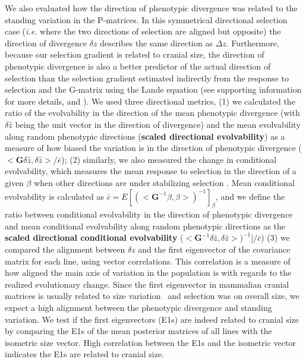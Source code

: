 \begin{refsection}
We also evaluated how the direction of phenotypic divergence was related
to the standing variation in the P-matrices. In this symmetrical
directional selection case (\emph{i.e.} where the two directions of
selection are aligned but opposite) the direction of divergence
\(\delta z\) describes the same direction as \(\Delta z\). Furthermore,
because our selection gradient is related to cranial size, the direction
of phenotypic divergence is also a better predictor of the actual
direction of selection than the selection gradient estimated indirectly
from the response to selection and the G-matrix using the Lande equation
(see supporting information for more details, and \textcite{Marroig2012-jd}). We used
three directional metrics, (1) we calculated the ratio of the
evolvability in the direction of the mean phenotypic divergence (with
\(\delta \hat z\) being the unit vector in the direction of divergence)
and the mean evolvability along random phenotypic directions
(\textbf{scaled directional evolvability}) as a measure of how biased
the variation is in the direction of phenotypic divergence
(\(<\mathbf{G}\delta \hat z ,\delta \hat z > / \bar{e}\)); (2)
similarly, we also measured the change in conditional evolvability,
which measures the mean response to selection in the direction of a
given \(\beta\) when other directions are under stabilizing selection
\parencite{Hansen2008-kz}. Mean conditional evolvability is calculated as
\(\bar{c} = E[(<\mathbf{G}^{-1}\beta, \beta>)^{-1}]_\beta\), and we
define the ratio between conditional evolvability in the direction of
phenotypic divergence and mean conditional evolvability along random
phenotypic directions as the \textbf{scaled directional conditional
evolvability}
(\(<\mathbf{G}^{-1}\delta \hat z, \delta \hat z>)^{-1}] / \bar{c}\)) (3)
we compared the alignment between \(\delta z\) and the first eigenvector
of the covariance matrix for each line, using vector correlations. This
correlation is a measure of how aligned the main axis of variation in
the population is with regards to the realized evolutionary change.
Since the first eigenvector in mammalian cranial matrices is usually
related to size variation~\parencite{Porto2009-pi} and selection was on overall
size, we expect a high alignment between the phenotypic divergence and
standing variation. We test if the first eigenvectors (E1s) are indeed
related to cranial size by comparing the E1s of the mean posterior
matrices of all lines with the isometric size vector. High correlation
between the E1s and the isometric vector indicates the E1s are related
to cranial size.


\end{refsection}
